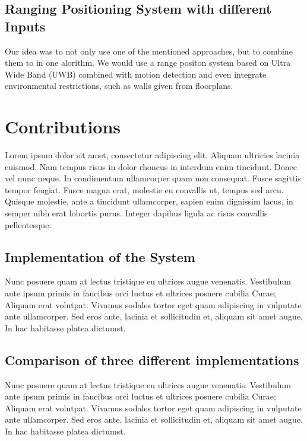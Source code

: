 \subsection{Ranging Positioning System with different Inputs}

Our idea was to not only use one of the mentioned approaches, but to combine them to in one alorithm. We would use a range positon system based on Ultra Wide Band (UWB) combined with motion detection and even integrate environmental restrictions, such as walls given from floorplans. 



\section{Contributions}

Lorem ipsum dolor sit amet, consectetur adipiscing elit. Aliquam ultricies lacinia euismod. Nam tempus risus in dolor rhoncus in interdum enim tincidunt. Donec vel nunc neque. In condimentum ullamcorper quam non consequat. Fusce sagittis tempor feugiat. Fusce magna erat, molestie eu convallis ut, tempus sed arcu. Quisque molestie, ante a tincidunt ullamcorper, sapien enim dignissim lacus, in semper nibh erat lobortis purus. Integer dapibus ligula ac risus convallis pellentesque.

\subsection{Implementation of the System}

Nunc posuere quam at lectus tristique eu ultrices augue venenatis. Vestibulum ante ipsum primis in faucibus orci luctus et ultrices posuere cubilia Curae; Aliquam erat volutpat. Vivamus sodales tortor eget quam adipiscing in vulputate ante ullamcorper. Sed eros ante, lacinia et sollicitudin et, aliquam sit amet augue. In hac habitasse platea dictumst.



\subsection{Comparison of three different implementations}

Nunc posuere quam at lectus tristique eu ultrices augue venenatis. Vestibulum ante ipsum primis in faucibus orci luctus et ultrices posuere cubilia Curae; Aliquam erat volutpat. Vivamus sodales tortor eget quam adipiscing in vulputate ante ullamcorper. Sed eros ante, lacinia et sollicitudin et, aliquam sit amet augue. In hac habitasse platea dictumst.


